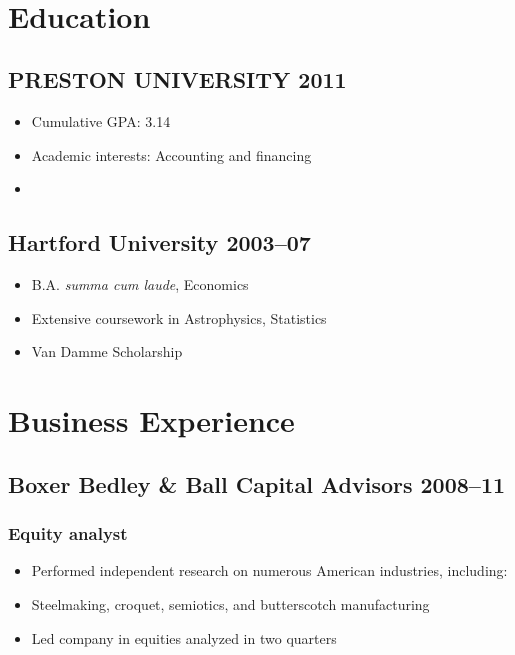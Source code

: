 \documentclass{article}
\begin{document}
	\begin{center}
    {\sffamily\LARGE\bfseries {}} \par\bigskip
		
		\sffamily\footnotesize {} \\ \medskip
		 \par\bigskip
	\end{center}

	\section{Education}
	\subsection{PRESTON UNIVERSITY \hfill 2011}
	\begin{itemize}
		\item Cumulative GPA: 3.14
		\item Academic interests: Accounting and financing
		\item 
	\end{itemize}
	
	\subsection{Hartford University \hfill 2003–07}
	\begin{itemize}
		\item B.A. \textit{summa cum laude}, Economics
		\item Extensive coursework in Astrophysics, Statistics
		\item Van Damme Scholarship
	\end{itemize}
	
\section{Business Experience}
	\subsection{Boxer Bedley \& Ball Capital Advisors \hfill 2008–11}
	\subsubsection{Equity analyst}
	\begin{itemize}
		\item Performed independent research on numerous American industries, including:
		\item Steelmaking, croquet, semiotics, and butterscotch manufacturing
		\item Led company in equities analyzed in two quarters
	\end{itemize}
	
\end{document}
